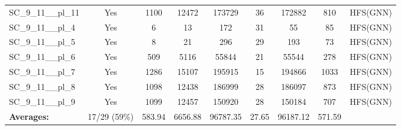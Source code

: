 \documentclass{article}
\begin{document}
\begin{tabular}{lcccccccc}
SC\_9\_11\_\_pl\_11 & Yes & 1100 & 12472 & 173729 & 36 & 172882 & 810 & HFS(GNN) \\
SC\_9\_11\_\_pl\_4 & Yes & 6 & 13 & 172 & 31 & 55 & 85 & HFS(GNN) \\
SC\_9\_11\_\_pl\_5 & Yes & 8 & 21 & 296 & 29 & 193 & 73 & HFS(GNN) \\
SC\_9\_11\_\_pl\_6 & Yes & 509 & 5116 & 55844 & 21 & 55544 & 278 & HFS(GNN) \\
SC\_9\_11\_\_pl\_7 & Yes & 1286 & 15107 & 195915 & 15 & 194866 & 1033 & HFS(GNN) \\
SC\_9\_11\_\_pl\_8 & Yes & 1098 & 12438 & 186999 & 28 & 186097 & 873 & HFS(GNN) \\
SC\_9\_11\_\_pl\_9 & Yes & 1099 & 12457 & 150920 & 28 & 150184 & 707 & HFS(GNN) \\
\textbf{Averages:} & 17/29 (59\%) & 583.94 & 6656.88 & 96787.35 & 27.65 & 96187.12 & 571.59 & \\
\bottomrule
\end{tabular}
\\[0.7cm]
\end{document}
